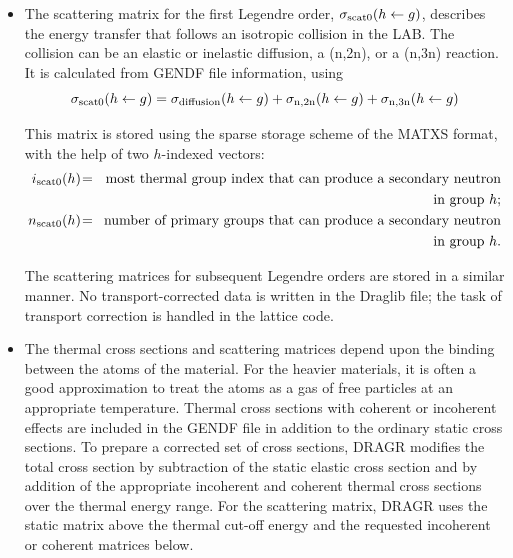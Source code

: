 \begin{itemize}
where $\pi(g)$ is recovered from {\tt MF=3} and {\tt MT=455} record of the
GENDF file and $\sigma_{\rm f}(g)$ is recovered from {\tt MF=3} and {\tt MT=18}
record of the GENDF file.

\item The scattering matrix for the first Legendre order,
$\sigma_{\rm scat0}(h \leftarrow g)$, describes the energy transfer that follows
an isotropic collision in the LAB. The collision can be an elastic or inelastic
diffusion, a (n,2n), or a (n,3n) reaction. It is calculated from GENDF file
information, using
\begin{equation}
\sigma_{\rm scat0}(h \leftarrow g)=\sigma_{\rm diffusion}(h \leftarrow g)+
\sigma_{\rm n,2n}(h \leftarrow g)+\sigma_{\rm n,3n}(h \leftarrow g)
\label{eq:eq1_609}
\end{equation}

This matrix is stored using the sparse storage scheme of the MATXS format,
with the help of two $h$-indexed vectors:
\vskip -0.8cm
\begin{eqnarray*}
i_{\rm scat0}(h) \hspace{-0.2em} &=& \hspace{-0.2em}
\hbox{most thermal group index that can produce a secondary neutron} \\
&~&  \hspace{-0.2em}\hbox{in group $h$;}
\\
n_{\rm scat0}(h) \hspace{-0.2em} &=& \hspace{-0.2em}
\hbox{number of primary groups that can produce a secondary neutron} \\
&~& \hspace{-0.2em} \hbox{in group $h$.}
\end{eqnarray*}

The scattering matrices for subsequent Legendre orders are stored in a similar
manner. No transport-corrected data is written in the Draglib file; the task
of transport correction is handled in the lattice code.

\item The thermal cross sections and scattering matrices depend upon the
binding between the atoms of the material. For the heavier materials, it
is often a good approximation to treat the atoms as a gas of free particles
at an appropriate temperature. Thermal cross sections with coherent or
incoherent effects are included in the GENDF file in addition to the ordinary
static cross sections. To prepare a corrected set of cross sections, DRAGR
modifies the total cross section by subtraction of the static elastic cross
section and by addition of the appropriate incoherent and coherent thermal
cross sections over the thermal energy range. For the scattering matrix,
DRAGR uses the static matrix above the thermal cut-off energy and the
requested incoherent or coherent matrices below.


\end{itemize}
